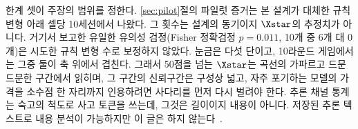 한계 셋이 주장의 범위를 정한다. \ref{sec:pilot}절의 파일럿 증거는 본 설계가 대체한 규칙 변형 아래 셀당 10세션에서 나왔다. 그 횟수는 설계의 동기이지 $\Xstar$의 추정치가 아니다. 거기서 보고한 유일한 유의성 검정(Fisher 정확검정 $p = 0.011$, 10개 중 6개 대 0개)은 시도한 규칙 변형 수로 보정하지 않았다. 눈금은 다섯 단이고, 10라운드 게임에서는 그중 둘이 축 위에서 겹친다. 그래서 50점을 넘는 $\Xstar$는 곡선의 가파르고 드문드문한 구간에서 읽히며, 그 구간의 신뢰구간은 구성상 넓고, 자주 포기하는 모델의 가격을 소수점 한 자리까지 인용하려면 사다리를 먼저 다시 벌려야 한다. 추론 채널 통계는 숙고의 척도로 사고 토큰을 쓰는데, 그것은 길이이지 내용이 아니다. 저장된 추론 텍스트로 내용 분석이 가능하지만 이 글은 하지 않는다~.
